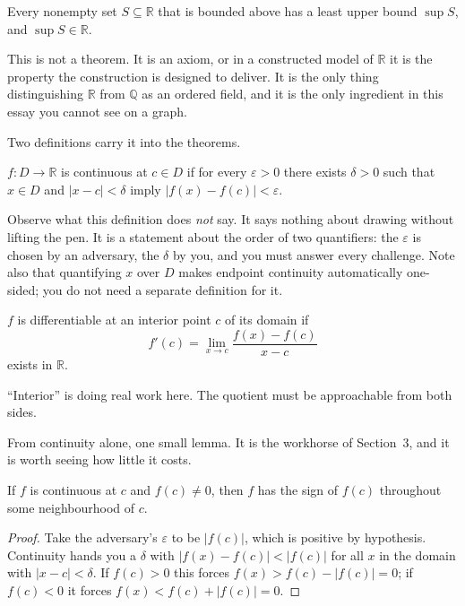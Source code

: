 \documentclass{essay}
\begin{document}
\begin{axiom}[Completeness]
  Every nonempty set \(S \subseteq \mathbb{R}\) that is bounded above has a least upper bound \(\sup S\), and \(\sup S \in \mathbb{R}\).
\end{axiom}

This is not a theorem. It is an axiom, or in a constructed model of \(\mathbb{R}\) it is the property the construction is designed to deliver. It is the only thing distinguishing \(\mathbb{R}\) from \(\mathbb{Q}\) as an ordered field, and it is the only ingredient in this essay you cannot see on a graph.

Two definitions carry it into the theorems.

\begin{definition}[Continuity]
  \(f : D \to \mathbb{R}\) is continuous at \(c \in D\) if for every \(\varepsilon > 0\) there exists \(\delta > 0\) such that \(x \in D\) and \(|x - c| < \delta\) imply \(|f(x) - f(c)| < \varepsilon\).
\end{definition}

Observe what this definition does \emph{not} say. It says nothing about drawing without lifting the pen. It is a statement about the order of two quantifiers: the \(\varepsilon\) is chosen by an adversary, the \(\delta\) by you, and you must answer every challenge. Note also that quantifying \(x\) over \(D\) makes endpoint continuity automatically one-sided; you do not need a separate definition for it.

\begin{definition}[Differentiability]
  \(f\) is differentiable at an interior point \(c\) of its domain if
  \[ f'(c) = \lim_{x \to c} \frac{f(x) - f(c)}{x - c} \]
  exists in \(\mathbb{R}\).
\end{definition}

``Interior'' is doing real work here. The quotient must be approachable from both sides.

From continuity alone, one small lemma. It is the workhorse of Section~3, and it is worth seeing how little it costs.

\begin{lemma}\label{lem:sign}
  If \(f\) is continuous at \(c\) and \(f(c) \neq 0\), then \(f\) has the sign of \(f(c)\) throughout some neighbourhood of \(c\).
\end{lemma}

\begin{proof}
  Take the adversary's \(\varepsilon\) to be \(|f(c)|\), which is positive by hypothesis. Continuity hands you a \(\delta\) with \(|f(x) - f(c)| < |f(c)|\) for all \(x\) in the domain with \(|x-c| < \delta\). If \(f(c) > 0\) this forces \(f(x) > f(c) - |f(c)| = 0\); if \(f(c) < 0\) it forces \(f(x) < f(c) + |f(c)| = 0\).
\end{proof}
\end{document}
